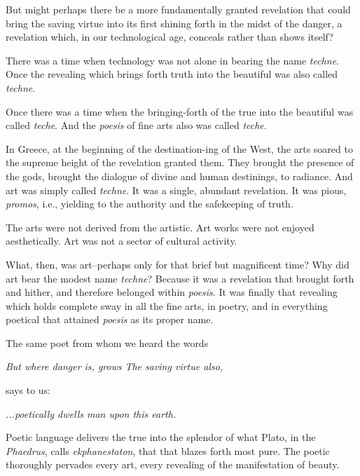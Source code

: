 \documentclass[12pt]{article}
\begin{document}
But might perhaps there be a more fundamentally granted revelation that could bring the saving virtue into its first shining forth in the midst of the danger, a revelation which, in our technological age, conceals rather than shows itself?

There was a time when technology was not alone in bearing the name \textit{techn{\-e}}. Once the revealing which brings forth truth into the beautiful was also called \textit{techn{\-e}}.

Once there was a time when the bringing-forth of the true into the beautiful was called \textit{tech{\-e}}. And the \textit{po{\-e}sis} of fine arts also was called \textit{tech{\-e}}.

In Greece, at the beginning of the destination-ing of the West, the arts soared to the supreme height of the revelation granted them. They brought the presence of the gods, brought the dialogue of divine and human destinings, to radiance. And art was simply called \textit{techn{\-e}}. It was a single, abundant revelation. It was pious, \textit{promos}, i.e., yielding to the authority and the safekeeping of truth.

The arts were not derived from the artistic. Art works were not enjoyed aesthetically. Art was not a sector of cultural activity.

What, then, was art--perhaps only for that brief but magnificent time? Why did art bear the modest name \textit{techn{\-e}}? Because it was a revelation that brought forth and hither, and therefore belonged within \textit{po{\-e}sis}. It was finally that revealing which holds complete sway in all the fine arts, in poetry, and in everything poetical that attained \textit{po{\-e}sis} as its proper name.

The same poet from whom we heard the words

\vspace{5mm}
\textit{But where danger is, grows}
\textit{The saving virtue also,}
\vspace{5mm}

says to us:

\vspace{5mm}
\textit{...poetically dwells man upon this earth.}
\vspace{5mm}

Poetic language delivers the true into the splendor of what Plato, in the \textit{Phaedrus}, calls \textit{ekphanestaton}, that that blazes forth most pure. The poetic thoroughly pervades every art, every revealing of the manifestation of beauty.
\end{document}
